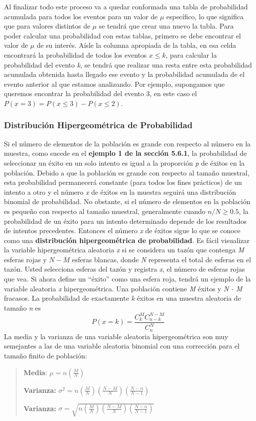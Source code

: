 \documentclass[]{article}
\begin{document}
 Al finalizar todo este proceso va a quedar conformada una tabla de probabilidad acumulada para todos los eventos para un valor de $\mu$ específico, lo que significa que para valores distintos de $\mu$ se tendrá que crear una nuevo la tabla.
 Para poder calcular una probabilidad con estas tablas, primero se debe encontrar el valor de $\mu$ de su interés. Aísle la columna apropiada de la tabla, en esa celda encontrará la probabilidad de todos los eventos $x \leq k$, para calcular la probabilidad del evento \textit{k}, se tendrá que realizar una resta entre esta probabilidad acumulada obtenida hasta llegado ese evento y la probabilidad acumulada de el evento anterior al que estamos analizando. Por ejemplo, supongamos que queremos encontrar la probabilidad del evento 3, en este caso el $P(x = 3) = P(x \leq 3) - P(x \leq 2)$.
 \subsubsection{Distribución Hipergeométrica de Probabilidad}
 Si el número de elementos de la población es grande con respecto al número en la muestra, como sucede en el \textbf{ejemplo 1 de la sección 5.6.1}, la probabilidad de seleccionar un éxito en un solo intento es igual a la proporción \textit{p} de éxitos en la población. Debido a que la población es grande con respecto al tamaño muestral, esta probabilidad permanecerá constante (para todos los fines prácticos) de un intento a otro y el número \textit{x} de éxitos en la muestra seguirá una distribución binomial de probabilidad. No obstante, si el número de elementos en la población es pequeño con respecto al tamaño muestral, generalmente cuando $n/N \geq 0.5$, la probabilidad de un éxito para un intento determinado depende de los resultados de intentos precedentes. Entonces el número \textit{x} de éxitos sigue lo que se conoce como una \textbf{distribución hipergeométrica de probabilidad}. \newline
 Es fácil visualizar la variable hipergeométrica aleatoria \textit{x} si se considera un tazón que contenga \textit{M} esferas rojas y $N - M$ esferas blancas, donde \textit{N}  representa el total de esferas en el tazón. Usted selecciona  esferas del tazón y registra \textit{x}, el número de esferas rojas que vea. Si ahora define un “éxito” como una esfera roja, tendrá un ejemplo de la variable aleatoria \textit{x} hipergeométrica.\newline
 Una población contiene \textit{M} éxitos y \textit{N - M} fracasos. La probabilidad de exactamente \textit{k} éxitos en una muestra aleatoria de tamaño \textit{n} es
 \[ P(x = k) = \frac{C^M_kC^{N-M}_{n-k}}{C^N_n} \]
 La media y la varianza de una variable aleatoria hipergeométrica son muy semejantes a las de una variable aleatoria binomial con una corrección para el tamaño finito de población:
 \begin{quote}
 	\item \textbf{Media}: $\mu = n(\frac{M}{N})$
 	\item \textbf{Varianza:} $\sigma^2 = n(\frac{M}{N})(\frac{N-M}{N})(\frac{N-n}{N-1})$
 	\item \textbf{Varianza:} $\sigma = \sqrt{n(\frac{M}{N})(\frac{N-M}{N})(\frac{N-n}{N-1})}$
 \end{quote}
\end{document}
